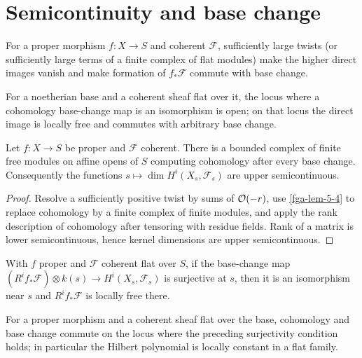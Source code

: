 \section{Semicontinuity and base change}
\begin{lemma}\label{fga-lem-5-4}
For a proper morphism $f:X\to S$ and coherent $\mathcal F$, sufficiently large
twists (or sufficiently large terms of a finite complex of flat modules) make
the higher direct images vanish and make formation of $f_*\mathcal F$ commute
with base change.
\end{lemma}
\begin{lemma}\label{fga-lem-5-5}
For a noetherian base and a coherent sheaf flat over it, the locus where a
cohomology base-change map is an isomorphism is open; on that locus the direct
image is locally free and commutes with arbitrary base change.
\end{lemma}
\begin{theorem}\label{fga-thm-5-6}
Let $f:X\to S$ be proper and $\mathcal F$ coherent.  There is a bounded complex
of finite free modules on affine opens of $S$ computing cohomology after every
base change.  Consequently the functions $s\mapsto\dim H^i(X_s,\mathcal F_s)$
are upper semicontinuous.
\end{theorem}
\begin{proof}
Resolve a sufficiently positive twist by sums of $\mathcal O(-r)$, use
\cref{fga-lem-5-4} to replace cohomology by a finite complex of finite modules,
and apply the rank description of cohomology after tensoring with residue
fields.  Rank of a matrix is lower semicontinuous, hence kernel dimensions are
upper semicontinuous.
\end{proof}
\begin{theorem}\label{fga-thm-5-7}
With $f$ proper and $\mathcal F$ coherent flat over $S$, if the base-change map
$(R^if_*\mathcal F)\otimes k(s)\to H^i(X_s,\mathcal F_s)$ is surjective at $s$,
then it is an isomorphism near $s$ and $R^if_*\mathcal F$ is locally free there.
\end{theorem}
\begin{theorem}\label{fga-thm-5-10}
For a proper morphism and a coherent sheaf flat over the base, cohomology and
base change commute on the locus where the preceding surjectivity condition
holds; in particular the Hilbert polynomial is locally constant in a flat
family.
\end{theorem}


